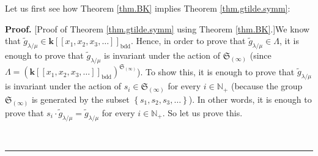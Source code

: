 \documentclass[numbers=enddot,12pt,final,onecolumn,notitlepage]{scrartcl}%
\theoremstyle{definition}
\newenvironment{proof}[1][Proof]{\noindent\textbf{#1.} }{\ \rule{0.5em}{0.5em}}
\begin{document}
Let us first see how Theorem \ref{thm.BK} implies Theorem
\ref{thm.gtilde.symm}:

\begin{proof}
[Proof of Theorem \ref{thm.gtilde.symm} using Theorem \ref{thm.BK}.]We know
that $\widetilde{g}_{\lambda/\mu}\in\mathbf{k}\left[  \left[  x_{1}%
,x_{2},x_{3},\ldots\right]  \right]  _{\operatorname*{bdd}}$. Hence, in order
to prove that $\widetilde{g}_{\lambda/\mu}\in\Lambda$, it is enough to prove
that $\widetilde{g}_{\lambda/\mu}$ is invariant under the action of
$\mathfrak{S}_{\left(  \infty\right)  }$ (since $\Lambda=\left(
\mathbf{k}\left[  \left[  x_{1},x_{2},x_{3},\ldots\right]  \right]
_{\operatorname*{bdd}}\right)  ^{\mathfrak{S}_{\left(  \infty\right)  }}$). To
show this, it is enough to prove that $\widetilde{g}_{\lambda/\mu}$ is
invariant under the action of $s_{i}\in\mathfrak{S}_{\left(  \infty\right)  }$
for every $i\in\mathbb{N}_{+}$ (because the group $\mathfrak{S}_{\left(
\infty\right)  }$ is generated by the subset $\left\{  s_{1},s_{2}%
,s_{3},\ldots\right\}  $). In other words, it is enough to prove that
$s_{i}\cdot\widetilde{g}_{\lambda/\mu}=\widetilde{g}_{\lambda/\mu}$ for every
$i\in\mathbb{N}_{+}$. So let us prove this.


\end{proof}
\end{document}
